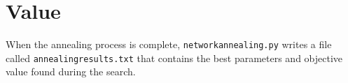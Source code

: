 \documentclass[12pt]{scrartcl}
\begin{document}
\section{Value}
When the annealing process is complete, \texttt{network{\textunderscore}annealing.py} writes a file called \texttt{annealing{\textunderscore}results.txt} that contains the best parameters and objective value found during the search.
\end{document}

